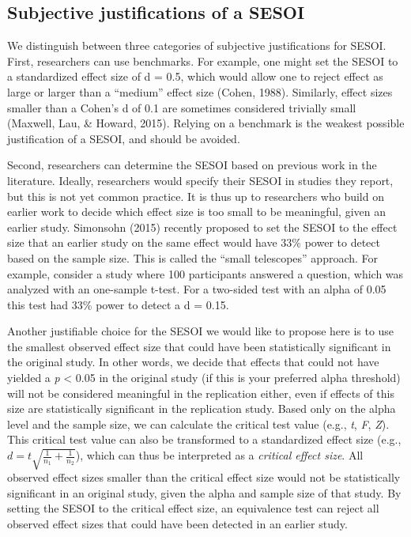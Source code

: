 \documentclass[english,man]{apa6}
\theoremstyle{definition}
\theoremstyle{definition}
\theoremstyle{definition}
\theoremstyle{remark}
\begin{document}
\subsection{Subjective justifications of a
SESOI}\label{subjective-justifications-of-a-sesoi}

We distinguish between three categories of subjective justifications for
SESOI. First, researchers can use benchmarks. For example, one might set
the SESOI to a standardized effect size of d = 0.5, which would allow
one to reject effect as large or larger than a \enquote{medium} effect
size (Cohen, 1988). Similarly, effect sizes smaller than a Cohen's d of
0.1 are sometimes considered trivially small (Maxwell, Lau, \& Howard,
2015). Relying on a benchmark is the weakest possible justification of a
SESOI, and should be avoided.

Second, researchers can determine the SESOI based on previous work in
the literature. Ideally, researchers would specify their SESOI in
studies they report, but this is not yet common practice. It is thus up
to researchers who build on earlier work to decide which effect size is
too small to be meaningful, given an earlier study. Simonsohn (2015)
recently proposed to set the SESOI to the effect size that an earlier
study on the same effect would have 33\% power to detect based on the
sample size. This is called the \enquote{small telescopes} approach. For
example, consider a study where 100 participants answered a question,
which was analyzed with an one-sample t-test. For a two-sided test with
an alpha of 0.05 this test had 33\% power to detect a d = 0.15.

Another justifiable choice for the SESOI we would like to propose here
is to use the smallest observed effect size that could have been
statistically significant in the original study. In other words, we
decide that effects that could not have yielded a \emph{p} \textless{}
0.05 in the original study (if this is your preferred alpha threshold)
will not be considered meaningful in the replication either, even if
effects of this size are statistically significant in the replication
study. Based only on the alpha level and the sample size, we can
calculate the critical test value (e.g., \emph{t}, \emph{F}, \emph{Z}).
This critical test value can also be transformed to a standardized
effect size (e.g.,
\(d = t \sqrt { \frac { 1} { n _ { 1} } + \frac { 1} { n _ { 2} } }\)),
which can thus be interpreted as a \emph{critical effect size}. All
observed effect sizes smaller than the critical effect size would not be
statistically significant in an original study, given the alpha and
sample size of that study. By setting the SESOI to the critical effect
size, an equivalence test can reject all observed effect sizes that
could have been detected in an earlier study.
\end{document}
